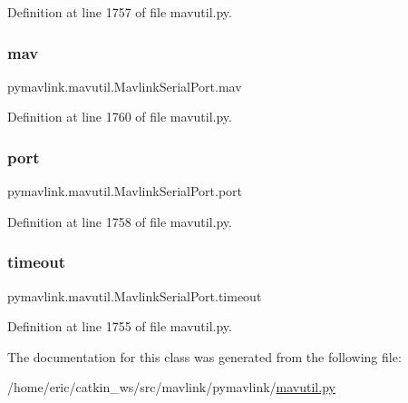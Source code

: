 Definition at line 1757 of file mavutil.\+py.

\mbox{\label{classpymavlink_1_1mavutil_1_1MavlinkSerialPort_a49f58191e0fec19e33e4f2c4c4217dce}} 
\subsubsection{\texorpdfstring{mav}{mav}}
{\footnotesize\ttfamily pymavlink.\+mavutil.\+Mavlink\+Serial\+Port.\+mav}



Definition at line 1760 of file mavutil.\+py.

\mbox{\label{classpymavlink_1_1mavutil_1_1MavlinkSerialPort_ad3f20565efc5c2bdfd09fc94dc1190a6}} 
\subsubsection{\texorpdfstring{port}{port}}
{\footnotesize\ttfamily pymavlink.\+mavutil.\+Mavlink\+Serial\+Port.\+port}



Definition at line 1758 of file mavutil.\+py.

\mbox{\label{classpymavlink_1_1mavutil_1_1MavlinkSerialPort_a4d25142b726458574a0e15fc6cf97d04}} 
\subsubsection{\texorpdfstring{timeout}{timeout}}
{\footnotesize\ttfamily pymavlink.\+mavutil.\+Mavlink\+Serial\+Port.\+timeout}



Definition at line 1755 of file mavutil.\+py.



The documentation for this class was generated from the following file\+:\begin{DoxyCompactItemize}
\item 
/home/eric/catkin\+\_\+ws/src/mavlink/pymavlink/\mbox{\hyperlink{mavutil_8py}{mavutil.\+py}}\end{DoxyCompactItemize}
